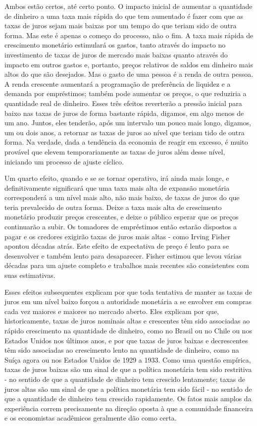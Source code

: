 \documentclass[a4paper,12pt]{article}[abntex2]
\begin{document}
Ambos estão certos, até certo ponto. O impacto inicial de aumentar a quantidade de dinheiro a uma taxa mais rápida do que tem aumentado é fazer com que as taxas de juros sejam mais baixas por um tempo do que teriam sido de outra forma. Mas este é apenas o começo do processo, não o fim. A taxa mais rápida de crescimento monetário estimulará os gastos, tanto através do impacto no investimento de taxas de juros de mercado mais baixas quanto através do impacto em outros gastos e, portanto, preços relativos de saldos em dinheiro mais altos do que são desejados. Mas o gasto de uma pessoa é a renda de outra pessoa. A renda crescente aumentará a programação de preferência de liquidez e a demanda por empréstimos; também pode aumentar os preços, o que reduziria a quantidade real de dinheiro. Esses três efeitos reverterão a pressão inicial para baixo nas taxas de juros de forma bastante rápida, digamos, em algo menos de um ano. Juntos, eles tenderão, após um intervalo um pouco mais longo, digamos, um ou dois anos, a retornar as taxas de juros ao nível que teriam tido de outra forma. Na verdade, dada a tendência da economia de reagir em excesso, é muito provável que elevem temporariamente as taxas de juros além desse nível, iniciando um processo de ajuste cíclico.

Um quarto efeito, quando e se se tornar operativo, irá ainda mais longe, e definitivamente significará que uma taxa mais alta de expansão monetária corresponderá a um nível mais alto, não mais baixo, de taxas de juros do que teria prevalecido de outra forma. Deixe a taxa mais alta de crescimento monetário produzir preços crescentes, e deixe o público esperar que os preços continuarão a subir. Os tomadores de empréstimos então estarão dispostos a pagar e os credores exigirão taxas de juros mais altas - como Irving Fisher apontou décadas atrás. Este efeito de expectativa de preço é lento para se desenvolver e também lento para desaparecer. Fisher estimou que levou várias décadas para um ajuste completo e trabalhos mais recentes são consistentes com suas estimativas.

Esses efeitos subsequentes explicam por que toda tentativa de manter as taxas de juros em um nível baixo forçou a autoridade monetária a se envolver em compras cada vez maiores e maiores no mercado aberto. Eles explicam por que, historicamente, taxas de juros nominais altas e crescentes têm sido associadas ao rápido crescimento na quantidade de dinheiro, como no Brasil ou no Chile ou nos Estados Unidos nos últimos anos, e por que taxas de juros baixas e decrescentes têm sido associadas ao crescimento lento na quantidade de dinheiro, como na Suíça agora ou nos Estados Unidos de 1929 a 1933. Como uma questão empírica, taxas de juros baixas são um sinal de que a política monetária tem sido restritiva - no sentido de que a quantidade de dinheiro tem crescido lentamente; taxas de juros altas são um sinal de que a política monetária tem sido fácil - no sentido de que a quantidade de dinheiro tem crescido rapidamente. Os fatos mais amplos da experiência correm precisamente na direção oposta à que a comunidade financeira e os economistas acadêmicos geralmente dão como certa.
\end{document}
